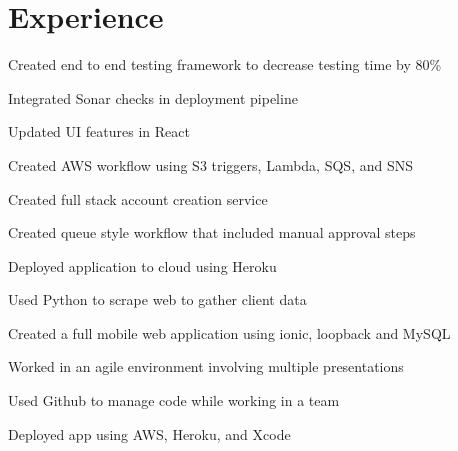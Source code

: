 \documentclass[]{deedy-resume-openfont}
\begin{document}
\hfill
\begin{minipage}[t]{0.66\textwidth} 


\section{Experience}

\vspace{\topsep} %
\begin{tightemize}
\item Created end to end testing framework to decrease testing time by 80\%
\item Integrated Sonar checks in deployment pipeline
\item Updated UI features in React
\item Created AWS workflow using S3 triggers, Lambda, SQS, and SNS
\end{tightemize}
\sectionsep



\begin{tightemize}
\item Created full stack account creation service
\item Created queue style workflow that included manual approval steps
\item Deployed application to cloud using Heroku
\item Used Python to scrape web to gather client data
\end{tightemize}
\sectionsep

\begin{tightemize}
 \item Created a full mobile web application using ionic, loopback and MySQL \item Worked in an agile environment involving multiple presentations \item Used Github to manage code while working in a team \item Deployed app using AWS, Heroku, and Xcode\end{tightemize}
\sectionsep


\end{minipage}
\end{document}
